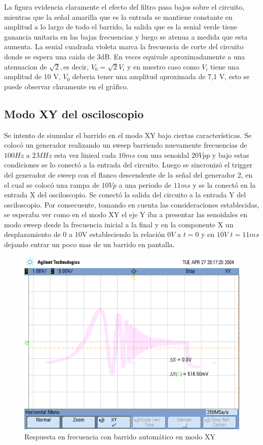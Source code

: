La figura evidencia claramente el efecto del filtro pasa bajos sobre
el circuito, mientras que la señal amarilla que es la entrada se
mantiene constante en amplitud a lo largo de todo el barrido, la salida
que es la senial verde tiene ganancia unitaria en las bajas frecuencias
y luego se atenua a medida que esta aumenta. La senial cuadrada violeta
marca la frecuencia de corte del circuito donde se espera una caida
de 3dB. En veces equivale aproximadamente a una atenuacion de $\sqrt{2},$es
decir, $V_{0}=\sqrt{2}V_{i}$ y en nuestro caso como $V_{i}$ tiene
una amplitud de 10 V, $V_{0}$ deberia tener una amplitud aproximada
de 7,1 V, esto se puede observar claramente en el gráfico.

\subsection{Modo XY del osciloscopio}

Se intento de siumular el barrido en el modo XY bajo ciertas características.
Se colocó un generador realizando un sweep barriendo nuevamente frecuencias
de $100Hz$ a $2MHz$ esta vez linieal cada $10ms$ con una senoidal
$20Vpp$ y bajo estas condiciones se lo conectó a la entrada del circuito.
Luego se sincronizó el trigger del generador de sweep con el flanco
descendente de la señal del generador 2, en el cual se colocó una
rampa de $10Vp$ a una periodo de $11ms$ y se la conectó en la entrada
X del osciloscopio. Se conectó la salida del circuito a la entrada
Y del osciloscopio. Por consecuente, tomando en cuenta las consideraciones
establecidas, se esperaba ver como en el modo XY el eje Y iba a presentar
las senoidales en modo sweep desde la frecuencia inicial a la final
y en la componente X un desplazamiento de 0 a 10V estableciendo la
relación $0V$ a $t=\text{0}$ y en $10V$ $t=11ms$ dejando entrar
un poco mas de un barrido en pantalla.
\begin{figure}[H]
\centering{}\includegraphics{./scope_24.png}\caption{Respuesta en frecuencia con barrido automático en modo XY}
\end{figure}

